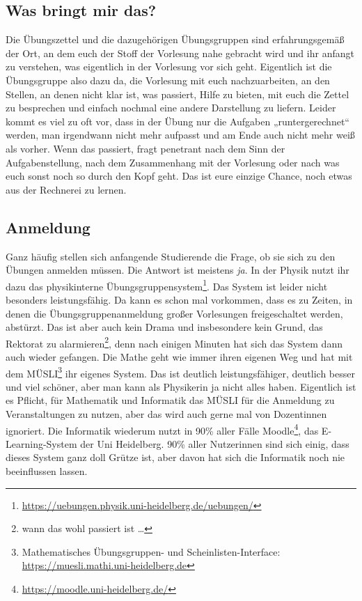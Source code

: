 \subsection{Was bringt mir das?}
Die Übungszettel und die dazugehörigen Übungsgruppen sind erfahrungsgemäß der Ort, an dem euch der Stoff der Vorlesung nahe gebracht wird und ihr anfangt zu verstehen, was eigentlich in der Vorlesung vor sich geht. Eigentlich ist die Übungsgruppe also dazu da, die Vorlesung mit euch nachzuarbeiten, an den Stellen, an denen nicht klar ist, was passiert, Hilfe zu bieten, mit euch die Zettel zu besprechen und einfach nochmal eine andere Darstellung zu liefern. Leider kommt es viel zu oft vor, dass in der Übung nur die Aufgaben „runtergerechnet“ werden, man irgendwann nicht mehr aufpasst und am Ende auch nicht mehr weiß als vorher. Wenn das passiert, fragt penetrant nach dem Sinn der Aufgabenstellung, nach dem Zusammenhang mit der Vorlesung oder nach was euch sonst noch so durch den Kopf geht. Das ist eure einzige Chance, noch etwas aus der Rechnerei zu lernen.

\subsection{Anmeldung}
Ganz häufig stellen sich anfangende Studierende die Frage, ob sie sich zu den Übungen anmelden müssen. Die Antwort ist meistens \emph{ja}. In der Physik nutzt ihr dazu das physikinterne Übungsgruppensystem\footnote{\url{https://uebungen.physik.uni-heidelberg.de/uebungen/}}. Das System ist leider nicht besonders leistungsfähig. Da kann es schon mal vorkommen, dass es zu Zeiten, in denen die Übungsgruppenanmeldung großer Vorlesungen freigeschaltet werden, abstürzt. Das ist aber auch kein Drama und insbesondere kein Grund, das Rektorat zu alarmieren\footnote{wann das wohl passiert ist \dots}, denn nach einigen Minuten hat sich das System dann auch wieder gefangen. Die Mathe geht wie immer ihren eigenen Weg  und hat mit dem MÜSLI\footnote{Mathematisches Übungsgruppen- und Scheinlisten-Interface: \url{https://muesli.mathi.uni-heidelberg.de}} ihr eigenes System. Das ist deutlich leistungsfähiger, deutlich besser und viel schöner, aber man kann als Physikerin ja nicht alles haben. Eigentlich ist es Pflicht, für Mathematik und Informatik das MÜSLI für die Anmeldung zu Veranstaltungen zu nutzen, aber das wird auch gerne mal von Dozentinnen ignoriert. Die Informatik wiederum nutzt in 90\% aller Fälle Moodle\footnote{\url{https://moodle.uni-heidelberg.de/}}, das E-Learning-System der Uni Heidelberg. 90\% aller Nutzerinnen sind sich einig, dass dieses System ganz doll Grütze ist, aber davon hat sich die Informatik noch nie beeinflussen lassen.

